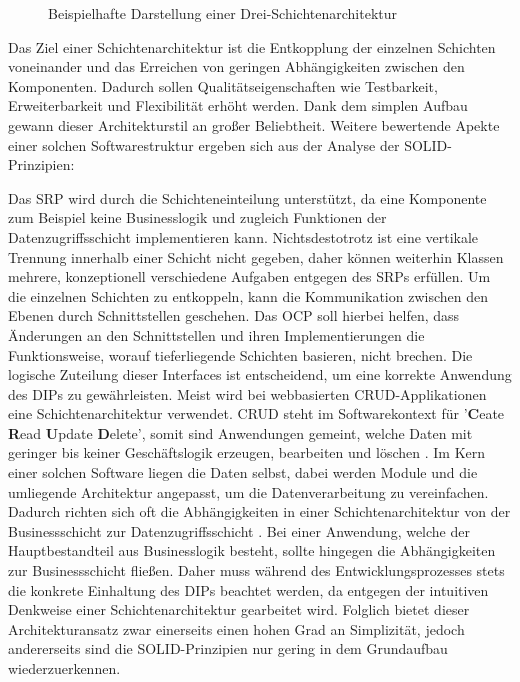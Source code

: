 \begin{figure}[htbp]
	\centering
	\large
	
	\caption{Beispielhafte Darstellung einer Drei-Schichtenarchitektur}
	\label{fig:Schichtenarchitektur}
\end{figure}

Das Ziel einer Schichtenarchitektur ist die Entkopplung der einzelnen Schichten voneinander und das Erreichen von geringen Abhängigkeiten zwischen den Komponenten. Dadurch sollen Qualitätseigenschaften wie Testbarkeit, Erweiterbarkeit und Flexibilität erhöht werden. Dank dem simplen Aufbau gewann dieser Architekturstil an großer Beliebtheit. Weitere bewertende Apekte einer solchen Softwarestruktur ergeben sich aus der Analyse der SOLID-Prinzipien:

Das \acrlong{SRP} wird durch die Schichteneinteilung unterstützt, da eine Komponente zum Beispiel keine Businesslogik und zugleich Funktionen der Datenzugriffsschicht implementieren kann. Nichtsdestotrotz ist eine vertikale Trennung innerhalb einer Schicht nicht gegeben, daher können weiterhin Klassen mehrere, konzeptionell verschiedene Aufgaben entgegen des SRPs erfüllen. Um die einzelnen Schichten zu entkoppeln, kann die Kommunikation zwischen den Ebenen durch Schnittstellen geschehen. Das \acrlong{OCP} soll hierbei helfen, dass Änderungen an den Schnittstellen und ihren Implementierungen die Funktionsweise, worauf tieferliegende Schichten basieren, nicht brechen. Die logische Zuteilung dieser Interfaces ist entscheidend, um eine korrekte Anwendung des \acrlong{DIP}s zu gewährleisten. Meist wird bei webbasierten CRUD-Applikationen eine Schichtenarchitektur verwendet. \acrshort{CRUD} steht im Softwarekontext für '\textbf{C}eate \textbf{R}ead \textbf{U}pdate \textbf{D}elete', somit sind Anwendungen gemeint, welche Daten mit geringer bis keiner Geschäftslogik erzeugen, bearbeiten und löschen \cite[S. 381]{Martin.1980}. Im Kern einer solchen Software liegen die Daten selbst, dabei werden Module und die umliegende Architektur angepasst, um die Datenverarbeitung zu vereinfachen. Dadurch richten sich oft die Abhängigkeiten in einer Schichtenarchitektur von der Businessschicht zur Datenzugriffsschicht \cite{Layered.SOLID}. Bei einer Anwendung, welche der Hauptbestandteil aus Businesslogik besteht, sollte hingegen die Abhängigkeiten zur Businessschicht fließen. Daher muss während des Entwicklungsprozesses stets die konkrete Einhaltung des DIPs beachtet werden, da entgegen der intuitiven Denkweise einer Schichtenarchitektur gearbeitet wird. Folglich bietet dieser Architekturansatz zwar einerseits einen hohen Grad an Simplizität, jedoch andererseits sind die SOLID-Prinzipien nur gering in dem Grundaufbau wiederzuerkennen.

